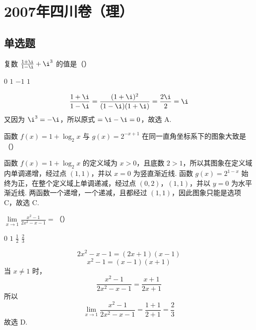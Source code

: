 \chapter{2007年四川卷（理）}
\section{单选题}
\begin{problem}
复数 \(\frac{1+\i}{1-\i} + \i^3\) 的值是（\quad）

\choices
    {\(0\)}
    {\(1\)}
    {\(-1\)}
    {\(1\)}
\end{problem}


\begin{solution}
\[
\frac{1+\i}{1-\i}=\frac{(1+\i)^2}{(1-\i)(1+\i)}=\frac{2\i}{2}=\i
\]
又因为 \(\i^3=-\i\)，所以原式 \(=\i-\i=0\)，故选 A.
\end{solution}

\begin{problem}
函数 \( f(x) = 1 + \log_2 x \) 与 \( g(x) = 2^{-x + 1} \) 在同一直角坐标系下的图象大致是（\quad）

    {}
    {}
    {}
\end{problem}


\begin{solution}
函数 \(f(x)=1+\log_2x\) 的定义域为 \(x>0\)，且底数 \(2>1\)，所以其图象在定义域内单调递增，经过点 \((1,1)\)，并以 \(x=0\) 为竖直渐近线. 函数 \(g(x)=2^{1-x}\) 始终为正，在整个定义域上单调递减，经过点 \((0,2)\)，\((1,1)\)，并以 \(y=0\) 为水平渐近线. 两函数一个递增，一个递减，且都经过 \((1,1)\)，因此图象只能是选项 C，故选 C.
\end{solution}

\begin{problem}
\(\displaystyle \lim\limits_{x\to 1}\frac{x^2 - 1}{2x^2 - x - 1} =\)（\quad）

\choices
    {\(0\)}
    {\(1\)}
    {\( \frac{1}{2} \)}
    {\( \frac{2}{3} \)}
\end{problem}


\begin{solution}
\[
2x^2-x-1=(2x+1)(x-1)
\]
\[
x^2-1=(x-1)(x+1)
\]
当 \(x\ne1\) 时，
\[
\frac{x^2-1}{2x^2-x-1}=\frac{x+1}{2x+1}
\]
所以
\[
\lim_{x\to1}\frac{x^2-1}{2x^2-x-1}=\frac{1+1}{2+1}=\frac23
\]
故选 D.
\end{solution}

